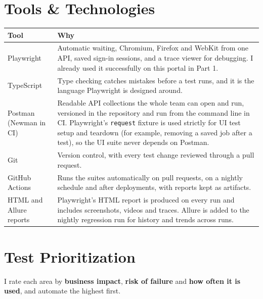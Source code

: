 \documentclass[11pt,a4paper]{article}
\begin{document}
\section{Tools \& Technologies}

\begin{tabularx}{\linewidth}{@{}L{3.6cm}Y@{}}
\toprule
\textbf{Tool} & \textbf{Why} \\
\midrule
Playwright & Automatic waiting, Chromium, Firefox and WebKit from one API, saved sign-in sessions, and a trace
viewer for debugging. I already used it successfully on this portal in Part 1. \\
TypeScript & Type checking catches mistakes before a test runs, and it is the language Playwright is designed around. \\
Postman (Newman in CI) & Readable API collections the whole team can open and run, versioned in the repository and
run from the command line in CI. Playwright's \texttt{request} fixture is used strictly for UI test setup and
teardown (for example, removing a saved job after a test), so the UI suite never depends on Postman. \\
Git & Version control, with every test change reviewed through a pull request. \\
GitHub Actions & Runs the suites automatically on pull requests, on a nightly schedule and after deployments,
with reports kept as artifacts. \\
HTML and Allure reports & Playwright's HTML report is produced on every run and includes screenshots, videos and
traces. Allure is added to the nightly regression run for history and trends across runs. \\
\bottomrule
\end{tabularx}

\section{Test Prioritization}

I rate each area by \textbf{business impact}, \textbf{risk of failure} and \textbf{how often it is used}, and
automate the highest first.
\end{document}
